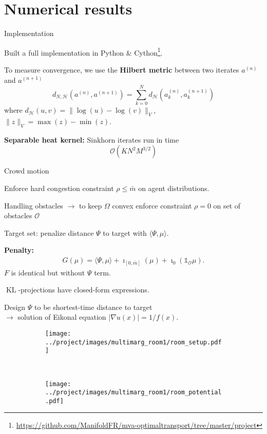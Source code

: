 \documentclass[xcolor={dvipsnames}]{beamer}
\newcommand{\calH}{\mathcal{H}}
\newcommand{\calO}{\mathcal{O}}
\DeclareMathOperator{\KL}{KL}
\newcommand{\bluefont}{\color{RoyalBlue}}
\begin{document}
\section{Numerical results}

\begin{frame}{Implementation}
	
	Built a full implementation in Python \& Cython\footnote{\url{https://github.com/ManifoldFR/mva-optimaltransport/tree/master/project}}.
	
	To measure convergence, we use the \textbf{\bluefont Hilbert metric} between two iterates $a^{(n)}$ and $a^{(n+1)}$
	\begin{equation}
		d_{N,\calH}(a^{(n)}, a^{(n+1)}) =
		\sum_{k=0}^{N}
		d_\calH(a_k^{(n)}, a_k^{(n+1)})
	\end{equation}
	where $d_\calH(u, v) = \| \log(u) - \log(v)\|_V$, $\|z\|_V = \max(z) - \min(z)$.
	
	\textbf{Separable heat kernel:} Sinkhorn iterates run in time
	\[
		\calO(KN^2 M^{3/2})
	\]
\end{frame}


\begin{frame}[allowframebreaks]{Crowd motion}
	
	Enforce hard congestion constraint $\rho \leq \bar{m}$ on agent distributions.
	
	Handling obstacles $\rightarrow$ to keep $\Omega$ convex enforce constraint $\rho = 0$ on set of obstacles $\mathscr{O}$
	
	Target set: penalize distance $\Psi$ to target with $\langle \Psi, \mu\rangle$.
	
	\textbf{Penalty:}
	\begin{align*}
		G(\mu) = \langle \Psi, \mu\rangle + \imath_{[0,\bar{m}]}(\mu) + \imath_0(\mathds{1}_\mathscr{O}\mu).
	\end{align*}
	$F$ is identical but without $\Psi$ term.
	
	$\KL$-projections have closed-form expressions.
	
	\framebreak
	
	Design $\Psi$ to be shortest-time distance to target\\
	$\rightarrow$ solution of Eikonal equation $|\nabla u(x)| = 1/f(x)$.
	
	\begin{figure}
		\centering
		\begin{subfigure}{.45\linewidth}
			\texttt{[image: ../project/images/multimarg\_room1/room\_setup.pdf]}
		\end{subfigure}~
		\begin{subfigure}{.49\linewidth}
			\texttt{[image: ../project/images/multimarg\_room1/room\_potential.pdf]}
		\end{subfigure}
	\end{figure}
	
\end{frame}
\end{document}

